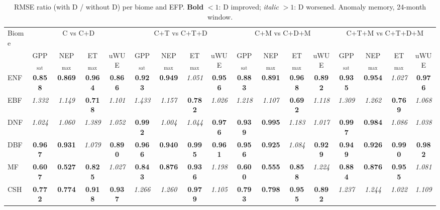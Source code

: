 \begin{table}
\centering
\caption{RMSE ratio (with D / without D) per biome and EFP. \textbf{Bold} $< 1$: D improved; \textit{italic} $> 1$: D worsened. Anomaly memory, 24-month window.}
\label{tab:rmse_ratio}
\scriptsize
\setlength{\tabcolsep}{4pt}
\renewcommand{\arraystretch}{1.05}
\begin{tabular}{l|cccc|cccc|cccc|cccc}
\toprule
Biome & \multicolumn{4}{c|}{C vs C$+$D} & \multicolumn{4}{c|}{C$+$T vs C$+$T$+$D} & \multicolumn{4}{c|}{C$+$M vs C$+$D$+$M} & \multicolumn{4}{c|}{C$+$T$+$M vs C$+$T$+$D$+$M} \\
 & GPP$_\mathrm{sat}$ & NEP$_\mathrm{max}$ & ET$_\mathrm{max}$ & uWUE & GPP$_\mathrm{sat}$ & NEP$_\mathrm{max}$ & ET$_\mathrm{max}$ & uWUE & GPP$_\mathrm{sat}$ & NEP$_\mathrm{max}$ & ET$_\mathrm{max}$ & uWUE & GPP$_\mathrm{sat}$ & NEP$_\mathrm{max}$ & ET$_\mathrm{max}$ & uWUE \\
\midrule
ENF & \textbf{0.858} & \textbf{0.869} & \textbf{0.964} & \textbf{0.866} & \textbf{0.923} & \textbf{0.949} & \textit{1.051} & \textbf{0.956} & \textbf{0.883} & \textbf{0.891} & \textbf{0.968} & \textbf{0.892} & \textbf{0.935} & \textbf{0.954} & \textit{1.027} & \textbf{0.976} \\
EBF & \textit{1.332} & \textit{1.149} & \textbf{0.718} & \textit{1.101} & \textit{1.433} & \textit{1.157} & \textbf{0.782} & \textit{1.026} & \textit{1.218} & \textit{1.107} & \textbf{0.692} & \textit{1.118} & \textit{1.309} & \textit{1.262} & \textbf{0.769} & \textit{1.068} \\
DNF & \textit{1.024} & \textit{1.060} & \textit{1.389} & \textit{1.052} & \textbf{0.992} & \textit{1.004} & \textit{1.044} & \textbf{0.976} & \textbf{0.939} & \textbf{0.995} & \textit{1.183} & \textit{1.017} & \textbf{0.997} & \textbf{0.984} & \textit{1.086} & \textit{1.038} \\
DBF & \textbf{0.967} & \textbf{0.931} & \textit{1.079} & \textbf{0.890} & \textbf{0.966} & \textbf{0.940} & \textbf{0.995} & \textbf{0.961} & \textbf{0.956} & \textbf{0.925} & \textit{1.084} & \textbf{0.929} & \textbf{0.949} & \textbf{0.926} & \textbf{0.990} & \textbf{0.982} \\
MF & \textbf{0.607} & \textbf{0.527} & \textbf{0.825} & \textit{1.027} & \textbf{0.843} & \textbf{0.876} & \textbf{0.936} & \textit{1.198} & \textbf{0.600} & \textbf{0.555} & \textbf{0.858} & \textit{1.224} & \textbf{0.884} & \textbf{0.876} & \textbf{0.955} & \textit{1.081} \\
CSH & \textbf{0.772} & \textbf{0.774} & \textbf{0.918} & \textbf{0.937} & \textit{1.266} & \textit{1.260} & \textbf{0.979} & \textit{1.105} & \textbf{0.793} & \textbf{0.798} & \textbf{0.955} & \textbf{0.892} & \textit{1.237} & \textit{1.244} & \textit{1.022} & \textit{1.109} \\

\end{tabular}
\end{table}

